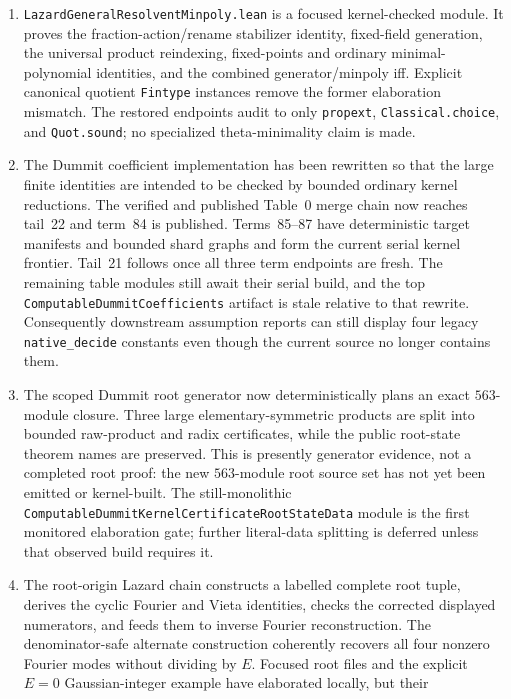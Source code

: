 \documentclass[11pt,a4paper,oneside]{article}
\newcommand{\lean}[1]{\nolinkurl{#1}}
\begin{document}
\begin{enumerate}
\item \texttt{LazardGeneralResolventMinpoly.lean} is a focused
  kernel-checked module.  It proves the fraction-action/rename stabilizer
  identity, fixed-field generation, the universal product reindexing,
  fixed-points and ordinary minimal-polynomial identities, and the combined
  generator/minpoly iff.  Explicit canonical quotient \lean{Fintype}
  instances remove the former elaboration mismatch.  The restored endpoints
  audit to only \lean{propext}, \lean{Classical.choice}, and
  \lean{Quot.sound}; no specialized theta-minimality claim is made.
\item The Dummit coefficient implementation has been rewritten so that the
  large finite identities are intended to be checked by bounded ordinary
  kernel reductions.  The verified and published Table~0 merge chain now
  reaches tail~22 and term~84 is published.  Terms~85--87 have deterministic
  target manifests and bounded shard graphs and form the current serial kernel
  frontier.  Tail~21 follows once all three term endpoints are fresh.  The
  remaining table modules still await their serial build, and the top
  \lean{ComputableDummitCoefficients} artifact
  is stale relative to that rewrite.  Consequently downstream assumption
  reports can still display four legacy \lean{native_decide} constants even
  though the current source no longer contains them.
\item The scoped Dummit root generator now deterministically plans an exact
  $563$-module closure.  Three large elementary-symmetric products are split
  into bounded raw-product and radix certificates, while the public
  root-state theorem names are preserved.  This is presently generator
  evidence, not a completed root proof: the new $563$-module root source set
  has not yet been emitted or kernel-built.  The still-monolithic
  \lean{ComputableDummitKernelCertificateRootStateData} module is the first
  monitored elaboration gate; further literal-data splitting is deferred
  unless that observed build requires it.
\item The root-origin Lazard chain constructs a labelled complete root tuple,
  derives the cyclic Fourier and Vieta identities, checks the corrected
  displayed numerators, and feeds them to inverse Fourier reconstruction.
  The denominator-safe alternate construction coherently recovers all four
  nonzero Fourier modes without dividing by $E$.  Focused root files and the
  explicit $E=0$ Gaussian-integer example have elaborated locally, but their

\end{enumerate}
\end{document}
